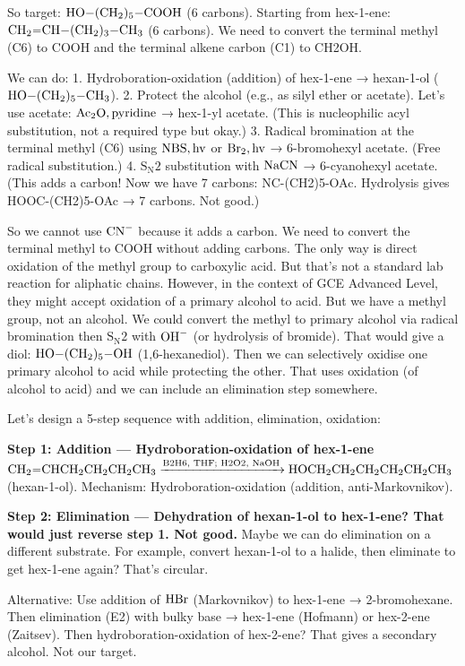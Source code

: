 \documentclass[11pt]{article}
\begin{document}
\begin{corrige}
So target: \(\ce{HO-(CH2)5-COOH}\) (6 carbons). Starting from hex-1-ene: \(\ce{CH2=CH-(CH2)3-CH3}\) (6 carbons). We need to convert the terminal methyl (C6) to COOH and the terminal alkene carbon (C1) to CH2OH.

We can do:
1. Hydroboration-oxidation (addition) of hex-1-ene → hexan-1-ol (\(\ce{HO-(CH2)5-CH3}\)).
2. Protect the alcohol (e.g., as silyl ether or acetate). Let's use acetate: \(\ce{Ac2O, pyridine}\) → hex-1-yl acetate. (This is nucleophilic acyl substitution, not a required type but okay.)
3. Radical bromination at the terminal methyl (C6) using \(\ce{NBS, hv}\) or \(\ce{Br2, hv}\) → 6-bromohexyl acetate. (Free radical substitution.)
4. \(\mathrm{S_N2}\) substitution with \(\ce{NaCN}\) → 6-cyanohexyl acetate. (This adds a carbon! Now we have 7 carbons: NC-(CH2)5-OAc. Hydrolysis gives HOOC-(CH2)5-OAc → 7 carbons. Not good.)

So we cannot use \(\ce{CN-}\) because it adds a carbon. We need to convert the terminal methyl to COOH without adding carbons. The only way is direct oxidation of the methyl group to carboxylic acid. But that's not a standard lab reaction for aliphatic chains. However, in the context of GCE Advanced Level, they might accept oxidation of a primary alcohol to acid. But we have a methyl group, not an alcohol. We could convert the methyl to primary alcohol via radical bromination then \(\mathrm{S_N2}\) with \(\ce{OH-}\) (or hydrolysis of bromide). That would give a diol: \(\ce{HO-(CH2)5-OH}\) (1,6-hexanediol). Then we can selectively oxidise one primary alcohol to acid while protecting the other. That uses oxidation (of alcohol to acid) and we can include an elimination step somewhere.

Let's design a 5-step sequence with addition, elimination, oxidation:

\textbf{Step 1: Addition — Hydroboration-oxidation of hex-1-ene}
\(\ce{CH2=CHCH2CH2CH2CH3 ->[{B2H6, THF; H2O2, NaOH}] HOCH2CH2CH2CH2CH2CH3}\) (hexan-1-ol).
Mechanism: Hydroboration-oxidation (addition, anti-Markovnikov).

\textbf{Step 2: Elimination — Dehydration of hexan-1-ol to hex-1-ene? That would just reverse step 1. Not good.}
Maybe we can do elimination on a different substrate. For example, convert hexan-1-ol to a halide, then eliminate to get hex-1-ene again? That's circular.

Alternative: Use addition of \(\ce{HBr}\) (Markovnikov) to hex-1-ene → 2-bromohexane. Then elimination (E2) with bulky base → hex-1-ene (Hofmann) or hex-2-ene (Zaitsev). Then hydroboration-oxidation of hex-2-ene? That gives a secondary alcohol. Not our target.


\end{corrige}
\end{document}
